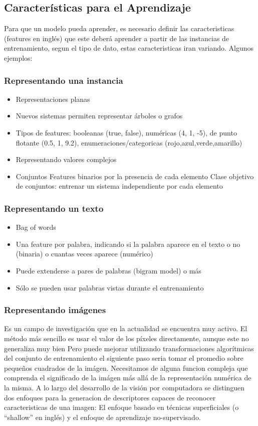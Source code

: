 \documentclass[a4paper,11pt,spanish]{book}
\begin{document}
    \subsection{Características para el Aprendizaje}
      Para que un modelo pueda aprender, es necesario definir las caracteristicas (features en inglés) que este deberá aprender a partir de las instancias de entrenamiento, 
      segun el tipo de dato, estas caracteristicas iran variando. Algunos ejemplos: 
      \subsubsection{Representando una instancia}
	\begin{itemize}
	  \item Representaciones planas
	  \item Nuevos sistemas permiten representar árboles o grafos
	  \item Tipos de features: booleanas (true, false), numéricas (4, 1, -5), de punto flotante (0.5, 1, 9.2), enumeraciones/categoricas  (rojo,azul,verde,amarillo)
	  \item Representando valores complejos
	  \item Conjuntos
	    \subitem Features binarios por la presencia de cada elemento
	    \subitem Clase objetivo de conjuntos: entrenar un sistema independiente por cada elemento
	\end{itemize}
      \subsubsection{Representando un texto}
	\begin{itemize}
	  \item Bag of words
	  \item Una feature por palabra, indicando si la palabra aparece en el texto o no (binaria) o cuantas veces aparece (numérico)
	  \item Puede extenderse a pares de palabras (bigram model) o más
	  \item Sólo se pueden usar palabras vistas durante el entrenamiento
	\end{itemize}
	\subsubsection{Representando imágenes}
	  Es un campo de investigación que en la actualidad se encuentra muy activo. El método más sencillo es usar el valor de los píxeles directamente, aunque este no generaliza muy bien
	  Pero puede mejorar utilizando transformaciones algorítmicas del conjunto de entrenamiento el siguiente paso seria tomar el promedio sobre pequeños cuadrados de la imágen.
	  Necesitamos de alguna funcion compleja que comprenda el significado de la imágen más allá de la representación numérica de la misma.
	  A lo largo del desarrollo de la visión por computadora se distinguen dos enfoques para la generacion de descriptores capaces de reconocer caracteristicas de una imagen: 
	  El enfoque basado en técnicas superficiales (o “shallow” en inglés) y el enfoque de aprendizaje no-supervisado.
\end{document}
